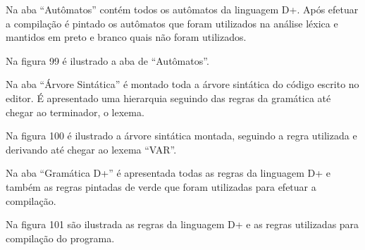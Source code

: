 \documentclass[12pt,oneside,a4paper,chapter=TITLE,section=TITLE,sumario=tradicional]{abntex2}
\begin{document}
Na aba “Autômatos” contém todos os autômatos da linguagem D+. Após efetuar a compilação é pintado os autômatos que foram utilizados na análise léxica e mantidos em preto e branco quais não foram utilizados.

Na figura 99 é ilustrado a aba de “Autômatos”.

\begin{figure}[H]
\end{figure}

Na aba “Árvore Sintática” é montado toda a árvore sintática do código escrito no editor. É apresentado uma hierarquia seguindo das regras da gramática até chegar ao terminador, o lexema.

Na figura 100 é ilustrado a árvore sintática montada, seguindo a regra utilizada e derivando até chegar ao lexema “VAR”.

\begin{figure}[H]
\end{figure}

Na aba “Gramática D+” é apresentada todas as regras da linguagem D+ e também as regras pintadas de verde que foram utilizadas para efetuar a compilação.

Na figura 101 são ilustrada as regras da linguagem D+ e as regras utilizadas para compilação do programa.

\begin{figure}[H]
\end{figure}
\end{document}

